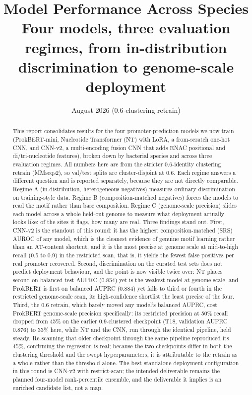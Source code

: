 \documentclass{article}
\title{Model Performance Across Species\\ \large Four models, three evaluation regimes, from in-distribution discrimination to genome-scale deployment}
\date{August 2026 (0.6-clustering retrain)}
\author{}
\begin{document}
\maketitle

\begin{abstract}
This report consolidates results for the four promoter-prediction models we now train (ProkBERT-mini, Nucleotide Transformer (NT) with LoRA, a from-scratch one-hot CNN, and CNN-v2, a multi-encoding fusion CNN that adds ENAC positional and di/tri-nucleotide features), broken down by bacterial species and across three evaluation regimes. All numbers here are from the stricter 0.6-identity clustering retrain (MMseqs2), so val/test splits are cluster-disjoint at 0.6. Each regime answers a different question and is reported separately, because they are not directly comparable. Regime A (in-distribution, heterogeneous negatives) measures ordinary discrimination on training-style data. Regime B (composition-matched negatives) forces the models to read the motif rather than base composition. Regime C (genome-scale precision) slides each model across a whole held-out genome to measure what deployment actually looks like: of the sites it flags, how many are real. Three findings stand out. First, CNN-v2 is the standout of this round: it has the highest composition-matched (SRS) AUROC of any model, which is the cleanest evidence of genuine motif learning rather than an AT-content shortcut, and it is the most precise at genome scale at mid-to-high recall (0.5 to 0.9) in the restricted scan, that is, it yields the fewest false positives per real promoter recovered. Second, discrimination on the curated test sets does not predict deployment behaviour, and the point is now visible twice over: NT places second on balanced test AUPRC (0.854) yet is the weakest model at genome scale, and ProkBERT is first on balanced AUPRC (0.884) yet falls to third or fourth in the restricted genome-scale scan, its high-confidence shortlist the least precise of the four. Third, the 0.6 retrain, which barely moved any model's balanced AUPRC, cost ProkBERT genome-scale precision specifically: its restricted precision at 50\% recall dropped from 45\% on the earlier 0.9-clustered checkpoint (T18, validation AUPRC 0.876) to 33\% here, while NT and the CNN, run through the identical pipeline, held steady. Re-scanning that older checkpoint through the same pipeline reproduced its 45\%, confirming the regression is real; because the two checkpoints differ in both the clustering threshold and the swept hyperparameters, it is attributable to the retrain as a whole rather than the threshold alone. The best standalone deployment configuration in this round is CNN-v2 with restrict-scan; the intended deliverable remains the planned four-model rank-percentile ensemble, and the deliverable it implies is an enriched candidate list, not a map.
\end{abstract}
\end{document}
